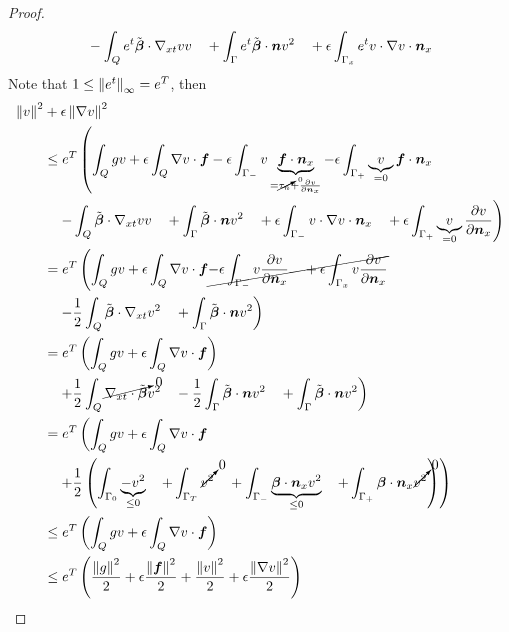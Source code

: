 \documentclass{article}
\begin{document}
\begin{proof}
\begin{align*}
&\quad-\int_Qe^{t}\tilde{\boldsymbol\beta}\cdot\nabla_{xt} vv
\quad+\int_\Gamma e^{t}\tilde{\boldsymbol\beta}\cdot\boldsymbol n v^2
\quad+\epsilon\int_{\Gamma_x}e^{t}v\cdot\nabla v\cdot\boldsymbol n_x
\end{align*}
Note that $1\leq\left\| e^t \right\|_\infty=e^T$, 
then
\begin{align*}
\left\| v \right\|^2
&+\epsilon\left\| \nabla v \right\|^2
\\
&\leq
e^T\left(
\int_Qgv
+\epsilon\int_Q\nabla v\cdot\boldsymbol f
-\epsilon\int_{\Gamma_-}v\underbrace{\boldsymbol f\cdot\boldsymbol n_x}_{=\cancelto{0}{\tau_n}+\frac{\partial v}{\partial\boldsymbol n_x}}
-\epsilon\int_{\Gamma_+}\underbrace{v}_{=0}\boldsymbol f\cdot\boldsymbol n_x
\right.\\
&\left.
\quad-\int_Q\tilde{\boldsymbol\beta}\cdot\nabla_{xt} vv
\quad+\int_\Gamma \tilde{\boldsymbol\beta}\cdot\boldsymbol n v^2
\quad+\epsilon\int_{\Gamma_-}v\cdot\nabla v\cdot\boldsymbol n_x
\quad+\epsilon\int_{\Gamma_+}\underbrace{v}_{=0}\frac{\partial v}{\partial\boldsymbol n_x}
\right)
\\
&=
e^T\left(
\int_Qgv
+\epsilon\int_Q\nabla v\cdot\boldsymbol f
\cancel{
-\epsilon\int_{\Gamma_-}v\frac{\partial v}{\partial\boldsymbol n_x}
\quad+\epsilon\int_{\Gamma_x}v\frac{\partial v}{\partial\boldsymbol n_x}
}
\right.\\
&\left.
\quad-\frac{1}{2}\int_Q\tilde{\boldsymbol\beta}\cdot\nabla_{xt} v^2
\quad+\int_\Gamma \tilde{\boldsymbol\beta}\cdot\boldsymbol n v^2
\right)
\\
&=
e^T\left(
\int_Qgv
+\epsilon\int_Q\nabla v\cdot\boldsymbol f
\right)\\
&\left.
\quad+\frac{1}{2}\int_Q\cancelto{0}{\nabla_{xt}\cdot\tilde{\boldsymbol\beta}} v^2
\quad-\frac{1}{2}\int_\Gamma\tilde{\boldsymbol\beta}\cdot\boldsymbol n v^2
\quad+\int_\Gamma \tilde{\boldsymbol\beta}\cdot\boldsymbol n v^2
\right)
\\
&=
e^T\left(
\int_Qgv
+\epsilon\int_Q\nabla v\cdot\boldsymbol f
\right.\\
&\left.
\quad+\frac{1}{2}\left( \int_{\Gamma_0} \underbrace{-v^2}_{\leq 0}
\quad+\int_{\Gamma_T} \cancelto{0}{v^2}
\quad+\int_{\Gamma_-} \underbrace{\boldsymbol\beta\cdot\boldsymbol n_x v^2}_{\leq 0}
\quad+\int_{\Gamma_+} \boldsymbol\beta\cdot\boldsymbol n_x \cancelto{0}{v^2}
 \right)
\right)
\\
&\leq
e^T\left(
\int_Qgv
+\epsilon\int_Q\nabla v\cdot\boldsymbol f
\right)
\\
&\leq
e^T\left(
\frac{\left\| g \right\|^2}{2}
+\epsilon\frac{\left\| \boldsymbol f \right\|^2}{2}
+\frac{\left\| v \right\|^2}{2}
+\epsilon\frac{\left\| \nabla v \right\|^2}{2}
\right)
\end{align*}
\end{proof}
\end{document}
